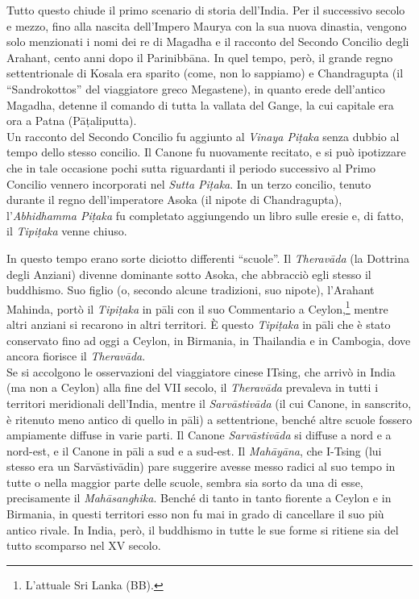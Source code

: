  Tutto questo chiude il primo scenario di storia
dell’India. Per il successivo secolo e mezzo, fino alla nascita dell’Impero
Maurya con la sua nuova dinastia, vengono solo menzionati i nomi dei re di
Magadha e il racconto del Secondo Concilio degli Arahant, cento anni dopo il
Parinibbāna. In quel tempo, però, il grande regno settentrionale di Kosala era
sparito (come, non lo sappiamo) e Chandragupta (il “Sandrokottos” del
viaggiatore greco Megastene), in quanto erede dell’antico Magadha, detenne il
comando di tutta la vallata
del Gange, la cui capitale era ora a Patna (Pāṭaliputta). \\
Un racconto del Secondo Concilio fu aggiunto al \emph{Vinaya Piṭaka} senza
dubbio al tempo dello stesso concilio. Il Canone fu nuovamente recitato, e si
può ipotizzare che in tale occasione pochi sutta riguardanti il periodo
successivo al Primo Concilio vennero incorporati nel \emph{Sutta Piṭaka}. In un
terzo concilio, tenuto durante il regno dell’imperatore Asoka (il nipote di
Chandragupta), l’\emph{Abhidhamma Piṭaka} fu completato aggiungendo un libro
sulle eresie e, di fatto, il \emph{Tipiṭaka} venne chiuso.

In questo tempo erano sorte diciotto differenti “scuole”. Il \emph{Theravāda}
(la Dottrina degli Anziani) divenne dominante sotto Asoka, che abbracciò egli
stesso il buddhismo. Suo figlio (o, secondo alcune tradizioni, suo nipote),
l’Arahant Mahinda, portò il \emph{Tipiṭaka} in pāli con il suo Commentario a
Ceylon,\footnote{L’attuale Sri Lanka (BB).} mentre altri anziani si recarono in
altri territori. È questo \emph{Tipiṭaka} in pāli che è stato conservato fino ad
oggi a Ceylon, in Birmania, in Thailandia e in
Cambogia, dove ancora fiorisce il \emph{Theravāda}. \\
Se si accolgono le osservazioni del viaggiatore cinese ITsing, che arrivò in
India (ma non a Ceylon) alla fine del VII secolo, il \emph{Theravāda} prevaleva
in tutti i territori meridionali dell’India, mentre il \emph{Sarvāstivāda} (il
cui Canone, in sanscrito, è ritenuto meno antico di quello in pāli) a
settentrione, benché altre scuole fossero ampiamente diffuse in varie parti. Il
Canone \emph{Sarvāstivāda} si diffuse a nord e a nord-est, e il Canone in pāli a
sud e a sud-est. Il \emph{Mahāyāna}, che I-Tsing (lui stesso era un
Sarvāstivādin) pare suggerire avesse messo radici al suo tempo in tutte o nella
maggior parte delle scuole, sembra sia sorto da una di esse, precisamente il
\emph{Mahāsanghika}. Benché di tanto in tanto fiorente a Ceylon e in Birmania,
in questi territori esso non fu mai in grado di cancellare il suo più antico
rivale. In India, però, il buddhismo in tutte le sue forme si ritiene sia del
tutto scomparso nel XV secolo.

